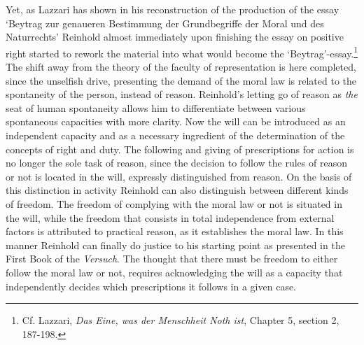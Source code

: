  Yet, as Lazzari has shown in his reconstruction of the production of the essay `Beytrag zur genaueren Bestimmung der Grundbegriffe der Moral und des Naturrechts' Reinhold almost immediately upon finishing the essay on positive right started to rework the material into what would become the `Beytrag'{-}essay.\footnote{ Cf. Lazzari, \textit{Das Eine, was der Menschheit Noth ist}, Chapter 5, section 2, 187{-}198.} The shift away from the theory of the faculty of representation is here completed, since the unselfish drive, presenting the demand of the moral law is related to the spontaneity of the person, instead of reason. Reinhold's letting go of reason as \textit{the} seat of human spontaneity allows him to differentiate between various spontaneous capacities with more clarity. Now the will can be introduced as an independent capacity and as a necessary ingredient of the determination of the concepts of right and duty. The following and giving of prescriptions for action is no longer the sole task of reason, since the decision to follow the rules of reason or not is located in the will, expressly distinguished from reason. On the basis of this distinction in activity Reinhold can also distinguish between different kinds of freedom. The freedom of complying with the moral law or not is situated in the will, while the freedom that consists in total independence from external factors is attributed to practical reason, as it establishes the moral law. In this manner Reinhold can finally do justice to his starting point as presented in the First Book of the \textit{Versuch}. The thought that there must be freedom to either follow the moral law or not, requires acknowledging the will as a capacity that independently decides which prescriptions it follows in a given case. 

